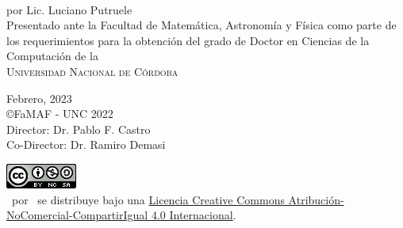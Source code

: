 \begin{titlepage}

\begin{center}
{\Large \ThesisTitle}\\ \vspace{10mm}
{\Large por Lic. Luciano Putruele}\\ \vspace{30mm}
{\large Presentado ante la Facultad de Matemática, Astronomía y Física como parte de los requerimientos para la obtención del grado de Doctor en Ciencias de la Computación de la \\ \vspace{10mm}
\textsc{\large Universidad Nacional de Córdoba}}\\ \vspace{25mm}

{\large Febrero, 2023} \\ \vspace{5mm}
{\large \copyright\;FaMAF \/- UNC 2022} \\ \vspace{5mm}
{\large Director: Dr. Pablo F. Castro} \\
{\large Co-Director: Dr. Ramiro Demasi}

\vspace{10mm}
\href{https://licensebuttons.net/l/by-nc-sa/4.0/88x31.png}{\includegraphics{Figs/licencia-famaf.png}}\\
\vspace{10mm}
{\ThesisTitle\ por \Author\ se distribuye bajo una \href{https://creativecommons.org/licenses/by-nc-sa/4.0/deed.es_ES}{Licencia Creative Commons Atribución-NoComercial-CompartirIgual 4.0 Internacional}.}
\end{center}  
\end{titlepage} 



